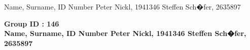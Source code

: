 \documentclass
[twoside,english,colorbacktitle,accentcolor=tud9c]
{tudexercise}
\newcommand{\studentdata}{Peter Nickl, 1941346 \qquad Steffen Sch�fer, 2635897}
\begin{document}
	
	\hwtitle{}
	\maketitle
	
	\begin{examheader}
		\normalsize
		\vspace{-1em}
		Name, Surname, ID Number \hfill \studentdata{}
		\vspace{-1em}
	\end{examheader} 
	\textbf{Group ID : 146}\\
	\textbf{Name, Surname, ID Number \hfill \studentdata{}}

	
	
	
	
	
\end{document}
